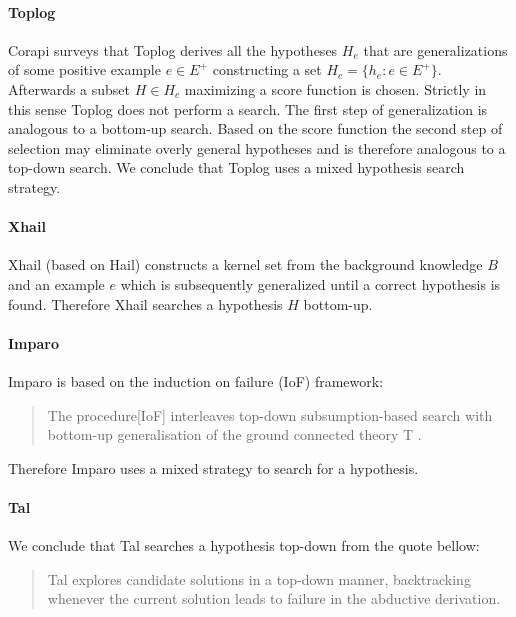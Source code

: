 \paragraph{Toplog\cite{muggleton2008toplog}}
Corapi\cite{corapi2011nonmonotonic} surveys that Toplog derives all the hypotheses $H_e$ that are generalizations of some positive example $e \in E^+$ constructing a set $H_c=\{h_e:e \in E^+\}$.
Afterwards a subset $H \in H_c$ maximizing a score function is chosen. Strictly in this sense Toplog does not perform a search. The first step of generalization is analogous to a bottom-up search. Based on the score function the second step of selection may eliminate overly general hypotheses and is therefore analogous to a top-down search. We conclude that Toplog uses a mixed hypothesis search strategy.
\paragraph{Xhail\cite{ray2003hybrid}}
Xhail (based on Hail) constructs a kernel set from the background knowledge $B$ and an example $e$ which is subsequently generalized until a correct hypothesis is found. Therefore Xhail searches a hypothesis $H$ bottom-up.

\paragraph{Imparo}
Imparo is based on the induction on failure (IoF) framework:
\begin{quote}\cite{kimber2012learning}
The procedure[IoF] interleaves top-down subsumption-based search with bottom-up generalisation of the ground connected theory T .
\end{quote}
Therefore Imparo uses a mixed strategy to search for a hypothesis.
\paragraph{Tal}
We conclude that Tal searches a hypothesis top-down from the quote bellow:
\begin{quote}\cite{corapi2010inductive}
Tal explores candidate solutions in a top-down manner,
backtracking whenever the current solution leads to failure in the abductive derivation.
\end{quote}
